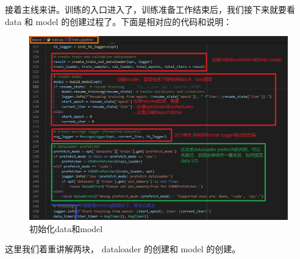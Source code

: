 \documentclass[../main.tex]{subfiles}
\begin{document}
接着主线来讲。训练的入口进入了，训练准备工作结束后，我们接下来就要看 data 和 model 的创建过程了。下面是相对应的代码和说明：

\begin{figure}[H]
\begin{center}
    \includegraphics[width=0.7\linewidth]{figures/getting_start_8.png}
    \caption{初始化data和model}
    \label{fig:getting_start_8}
\end{center}
\vspace{-0.5cm}
\end{figure}

这里我们着重讲解两块， dataloader 的创建和 model 的创建。
\end{document}
